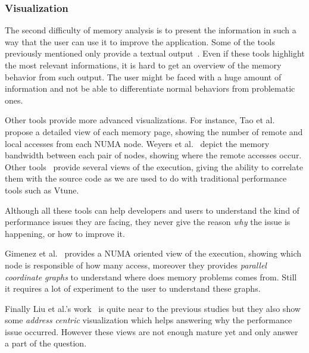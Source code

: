 \subsubsection{Visualization}

The second difficulty of memory analysis is to present the information in such
a way that the user can use it to improve the application. Some of the tools
previously mentioned only provide a textual
output~\cite{Lachaize12MemProf,McCurdy2010,Martonosi92MemSpy}. Even if these
tools highlight the most relevant informations, it is hard to get an overview
of the memory behavior from such output. The user might be faced with a huge
amount of information and not be able to differentiate normal behaviors from
problematic ones.


Other tools provide more advanced visualizations. For
instance, Tao et al.~\cite{Tao01Visualizing} propose a detailed view of each memory
page, showing the number of remote and local accesses from each NUMA node. Weyers et
al.~\cite{Weyers14Visualization} depict the memory bandwidth between each pair of nodes,
showing where the remote accesses occur. Other
tools~\cite{DeRose01Hardware,DeRose02SIGMA,Bosch00Rivet} provide several views
of the execution, giving the ability to correlate them with the source code as
we are used to do with traditional performance tools such as Vtune.

Although all these tools can help developers and users to understand the kind of performance issues they are facing, they never give the
reason \emph{why} the issue is happening, or how to improve it.

Gimenez et al.~\cite{Gimenez14Dissecting} provides a NUMA oriented view of the
execution, showing which node is responsible of how many access, moreover they
provides \emph{parallel coordinate graphs} to understand where does memory
problems comes from. Still it requires a lot of experiment to the user to
understand these graphs.

Finally Liu et al.'s work~\cite{Liu14Tool} is quite near to the previous studies but
they also show some \emph{address centric} visualization which helps answering
why the performance issue occurred. However these views are not enough mature
yet and only answer a part of the question.


